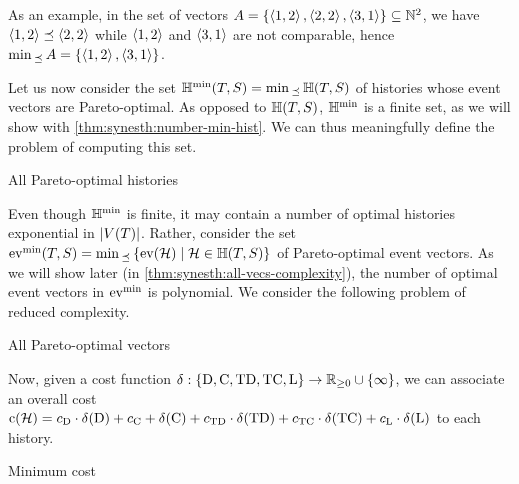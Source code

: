 As an example, in the set of vectors \(A = \{\left\langle1, 2\right\rangle, \left\langle2, 2\right\rangle, \left\langle3, 1\right\rangle\} \subseteq \mathbb{N}^2\), we have \(\left\langle1, 2\right\rangle \preceq \left\langle2, 2\right\rangle\) while \(\left\langle1, 2\right\rangle\) and \(\left\langle3, 1\right\rangle\) are not comparable, hence \(\min{}_{\preceq}\,{A} = \{\left\langle1, 2\right\rangle, \left\langle3, 1\right\rangle\}\).

Let us now consider the set \(\mathbb{H}^{\mathrm{min}}(T, S) = \min{}_{\preceq}\, \mathbb{H}(T, S)\) of histories whose event vectors are Pareto-optimal.
As opposed to \(\mathbb{H}(T, S)\), \(\mathbb{H}^{\mathrm{min}}\) is a finite set, as we will show with \cref{thm:synesth:number-min-hist}.
We can thus meaningfully define the problem of computing this set.

\begin{problem}{All Pareto-optimal histories\label{prob:synesth:all-hists}}
\end{problem}

Even though \(\mathbb{H}^{\mathrm{min}}\) is finite, it may contain a number of optimal histories exponential in \(|V(T)|\). 
Rather, consider the set \(\mathrm{ev}^{\mathrm{min}}(T, S) = \min{}_{\preceq}\, \{\mathrm{ev}(\mathcal{H}) \mid \mathcal{H} \in \mathbb{H}(T, S)\}\) of Pareto-optimal event vectors.
As we will show later (in \cref{thm:synesth:all-vecs-complexity}), the number of optimal event vectors in \(\mathrm{ev}^{\mathrm{min}}\) is polynomial.
We consider the following problem of reduced complexity.

\begin{problem}{All Pareto-optimal vectors\label{prob:synesth:all-vecs}}
\end{problem}

Now, given a cost function \(\delta\kern.1pt : \{\mathrm{D}, \mathrm{C}, \mathrm{TD}, \mathrm{TC}, \mathrm{L}\} \rightarrow \mathbb{R}_{\ge 0} \cup \{\infty\}\), we can associate an overall cost \(\mathrm{c}(\mathcal{H}) = c_{\mathrm{D}} \cdot \delta\kern.1pt(\mathrm{D}) + c_{\mathrm{C}} + \delta\kern.1pt(\mathrm{C}) + c_{\mathrm{TD}} \cdot \delta\kern.1pt(\mathrm{TD}) + c_{\mathrm{TC}} \cdot \delta\kern.1pt(\mathrm{TC}) + c_{\mathrm{L}} \cdot \delta\kern.1pt(\mathrm{L})\) to each history.

\begin{problem}{Minimum cost\label{prob:synesth:min-cost}}
\end{problem}

